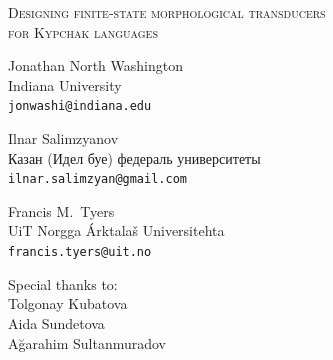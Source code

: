 \documentclass[fontscale=0.3,landscape,paperwidth=72in,paperheight=36in]{baposter}  %
\begin{document}
\begin{poster}
{			%
		}{
			{\vspace{0pt}\hspace{1cm}
			{\titlefont \textsc{Designing finite-state morphological transducers\\for Kypchak languages}}}
		}{

			\vspace{-0.5em}
			\begin{center}
			{\begin{minipage}[t]{12em}
				\begin{spacing}{0.4}
					{Jonathan North Washington}\\
					{\footnotesize Indiana University\\\texttt{jonwashi@indiana.edu}}
				\end{spacing}
			\end{minipage}
			\begin{minipage}[t]{11em}
				\begin{spacing}{0.4}
					{Ilnar Salimzyanov}\\
					{\footnotesize Казан (Идел буе) федераль университеты \\\texttt{ilnar.salimzyan@gmail.com}}
				\end{spacing}
			\end{minipage}
			\begin{minipage}[t]{9em}
				\begin{spacing}{0.4}
					{Francis M.\ Tyers}\\
					{\footnotesize UiT Norgga Árktalaš Universitehta \\\texttt{francis.tyers@uit.no}}
				\end{spacing}
			\end{minipage}}
			\begin{minipage}[t]{7em}
				\vspace{-0.7em}
				\begin{spacing}{0.4}
					{\footnotesize Special thanks to:}\\
					{\small Tolgonay Kubatova}\\
					{\small Aida Sundetova}\\
					{\small Ağarahim Sultanmuradov}\\
				\end{spacing}
			\end{minipage}
			\end{center}

}
\end{poster}
\end{document}
